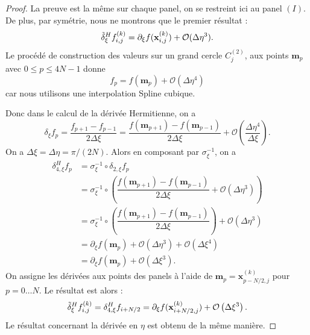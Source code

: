 \begin{proof}
La preuve est la même sur chaque panel, on se restreint ici au panel $(I)$. De plus, par symétrie, nous ne montrons que le premier résultat :
\begin{equation}
\tilde{\delta}^H_{\xi} f_{i,j}^{(k)} = \partial_{\xi} f(\mathbf{x}_{i,j}^{(k)}) + \mathcal{O}(\Delta \eta^3).
\end{equation}
Le procédé de construction des valeurs sur un grand cercle $C_j^{(2)}$, aux points $\mathbf{m}_p$ avec $0 \leq p \leq 4N-1$ donne
\begin{equation}
f_p = f(\mathbf{m}_p) + \mathcal{O}(\Delta \eta^4)
\end{equation}
car nous utilisons une interpolation Spline cubique.

Donc dans le calcul de la dérivée Hermitienne, on a 
\begin{equation}
\delta_{\xi} f_p = \dfrac{f_{p+1} - f_{p-1}}{2 \Delta \xi} = \dfrac{f(\mathbf{m}_{p+1}) - f(\mathbf{m}_{p-1})}{2 \Delta \xi} + \mathcal{O}\left( \dfrac{\Delta \eta^4}{\Delta \xi} \right).
\end{equation}
On a $\Delta \xi = \Delta \eta = \pi/(2N)$. Alors en composant par $\sigma_{\xi}^{-1}$, on a 
\begin{align*}
\delta_{4,\xi}^H f_p & = \sigma_{\xi}^{-1} \circ \delta_{2,\xi} f_p \\
                   & = \sigma_{\xi}^{-1} \circ \left( \dfrac{f(\mathbf{m}_{p+1}) - f(\mathbf{m}_{p-1})}{2 \Delta \xi} + \mathcal{O}\left( \Delta \eta^3 \right) \right)\\
                   & = \sigma_{\xi}^{-1} \circ \left( \dfrac{f(\mathbf{m}_{p+1}) - f(\mathbf{m}_{p-1})}{2 \Delta \xi}\right)  + \mathcal{O}\left( \Delta \eta^3 \right) \\
                   & = \partial_{\xi}f(\mathbf{m}_p) + \mathcal{O}\left( \Delta \eta^3 \right) + \mathcal{O}\left( \Delta \xi^4 \right) \\
                   & = \partial_{\xi}f(\mathbf{m}_p) + \mathcal{O}\left( \Delta \xi^3 \right).
\end{align*}
On assigne les dérivées aux points des panels à l'aide de $\mathbf{m}_p=\mathbf{x}^{(k)}_{p-N/2,j}$ pour $p = 0 \ldots N$. Le résultat est alors :
\begin{equation}
\tilde{\delta}^H_{\xi} f^{(k)}_{i,j} = \delta_{4,\xi}^H f_{i+N/2} = \partial_{\xi} f(\mathbf{x}^{(k)}_{i+N/2,j}) + \mathcal{O}\left( \Delta \xi^3 \right).
\end{equation}
Le résultat concernant la dérivée en $\eta$ est obtenu de la même manière.
\end{proof}

